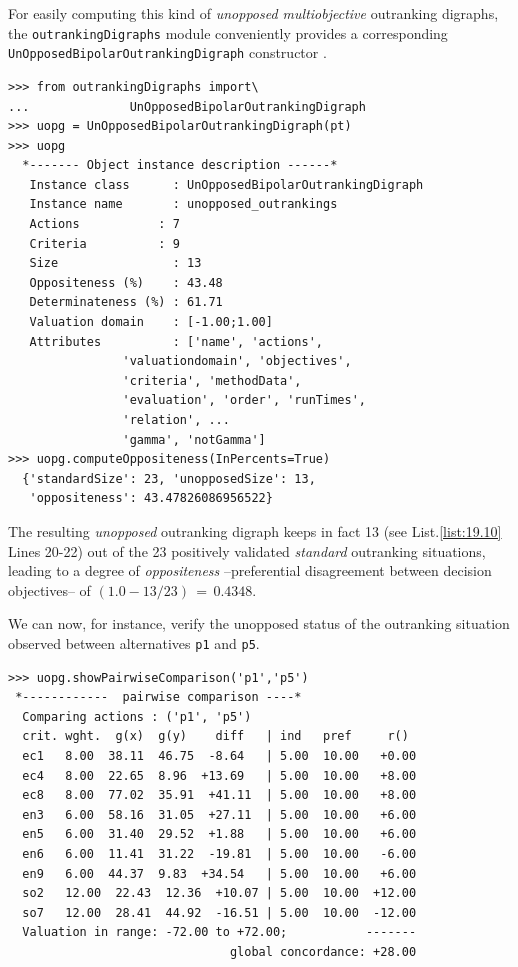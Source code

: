 For easily computing this kind of \emph{unopposed multiobjective} outranking digraphs, the \texttt{outrankingDigraphs} module conveniently provides a corresponding\\ \texttt{UnOpposedBipolarOutrankingDigraph} constructor .
\begin{lstlisting}[caption={Computing unopposed outranking digraphs},label=list:19.10]
>>> from outrankingDigraphs import\
...              UnOpposedBipolarOutrankingDigraph
>>> uopg = UnOpposedBipolarOutrankingDigraph(pt)
>>> uopg
  *------- Object instance description ------*
   Instance class      : UnOpposedBipolarOutrankingDigraph
   Instance name       : unopposed_outrankings
   Actions           : 7
   Criteria          : 9
   Size                : 13
   Oppositeness (%)    : 43.48
   Determinateness (%) : 61.71
   Valuation domain    : [-1.00;1.00]
   Attributes          : ['name', 'actions',
                'valuationdomain', 'objectives',
                'criteria', 'methodData',
                'evaluation', 'order', 'runTimes',
                'relation', ...
                'gamma', 'notGamma']
>>> uopg.computeOppositeness(InPercents=True)
  {'standardSize': 23, 'unopposedSize': 13,
   'oppositeness': 43.47826086956522}			   
\end{lstlisting}

The resulting \emph{unopposed} outranking digraph keeps in fact 13 (see List.\vref{list:19.10} Lines 20-22) out of the 23 positively validated \emph{standard} outranking situations, leading to a degree of \emph{oppositeness} --preferential disagreement between decision objectives-- of $(1.0 - 13/23)\,=\,0.4348$.

We can now, for instance, verify the unopposed status of the outranking situation observed between alternatives \texttt{p1} and \texttt{p5}.
\begin{lstlisting}[caption={Example of unopposed multiobjective outranking situation},label=list:19.11]
>>> uopg.showPairwiseComparison('p1','p5')
 *------------  pairwise comparison ----*
  Comparing actions : ('p1', 'p5')
  crit. wght.  g(x)  g(y)    diff   | ind   pref     r()
  ec1   8.00  38.11  46.75  -8.64   | 5.00  10.00   +0.00
  ec4   8.00  22.65  8.96  +13.69   | 5.00  10.00   +8.00
  ec8   8.00  77.02  35.91  +41.11  | 5.00  10.00   +8.00
  en3   6.00  58.16  31.05  +27.11  | 5.00  10.00   +6.00
  en5   6.00  31.40  29.52  +1.88   | 5.00  10.00   +6.00
  en6   6.00  11.41  31.22  -19.81  | 5.00  10.00   -6.00
  en9   6.00  44.37  9.83  +34.54   | 5.00  10.00   +6.00
  so2   12.00  22.43  12.36  +10.07 | 5.00  10.00  +12.00
  so7   12.00  28.41  44.92  -16.51 | 5.00  10.00  -12.00
  Valuation in range: -72.00 to +72.00;           -------
                               global concordance: +28.00
\end{lstlisting}

